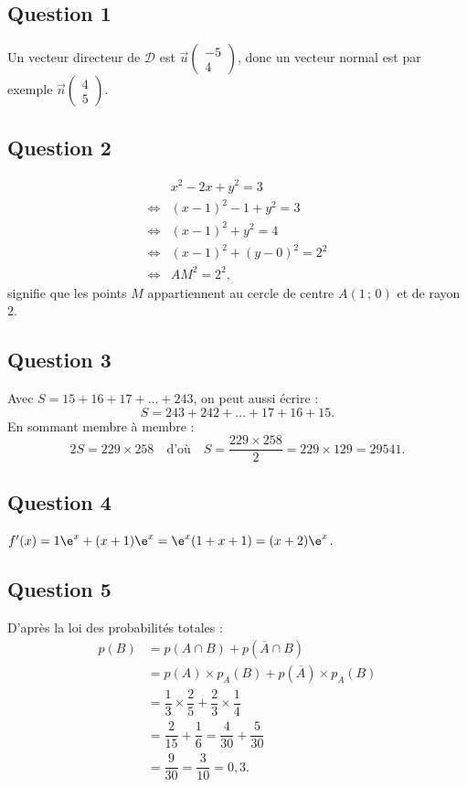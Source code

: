 \subsection*{Question 1}

Un vecteur directeur de \(\mathcal{D}\) est \(\vec{u} \begin{pmatrix} -5 \\ 4 \end{pmatrix}\), donc un vecteur normal est par exemple \(\vec{n} \begin{pmatrix} 4 \\ 5 \end{pmatrix}\).

\subsection*{Question 2}

\begin{align*}
&x^2 - 2x + y^2 = 3 \\
\iff &(x - 1)^2 - 1 + y^2 = 3 \\
\iff &(x - 1)^2 + y^2 = 4 \\
\iff &(x - 1)^2 + (y - 0)^2 = 2^2 \\
\iff &AM^2 = 2^2,
\end{align*}
signifie que les points \(M\) appartiennent au cercle de centre \(A(1\,;\,0)\) et de rayon 2.

\subsection*{Question 3}

Avec \(S = 15 + 16 + 17 + \dots + 243\), on peut aussi écrire :
\[
S = 243 + 242 + \dots + 17 + 16 + 15.
\]
En sommant membre à membre :
\[
2S = 229 \times 258 \quad \text{d'où} \quad S = \dfrac{229 \times 258}{2} = 229 \times 129 = 29541.
\]

\subsection*{Question 4}

\(f'(x) = 1\e^x + (x + 1) \e^x = \e^x(1 + x + 1) = (x + 2) \e^x\).

\subsection*{Question 5}

D'après la loi des probabilités totales :
\begin{align*}
p(B) &= p(A \cap B) + p(\overline{A} \cap B) \\
&= p(A) \times p_A(B) + p(\overline{A}) \times p_{\overline{A}}(B) \\
&= \dfrac{1}{3} \times \dfrac{2}{5} + \dfrac{2}{3} \times \dfrac{1}{4} \\
&= \dfrac{2}{15} + \dfrac{1}{6} = \dfrac{4}{30} + \dfrac{5}{30} \\
&= \dfrac{9}{30} = \dfrac{3}{10} = 0{,}3.
\end{align*}

